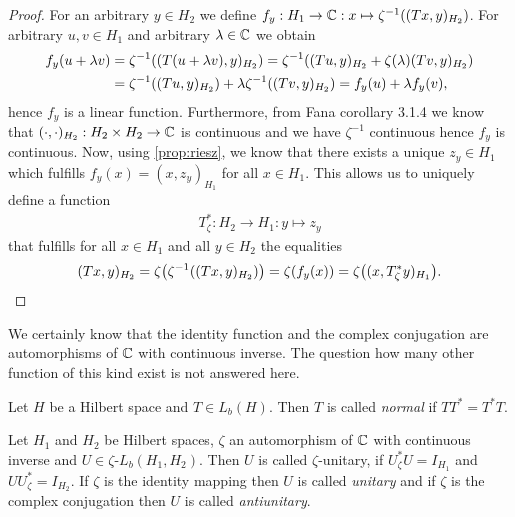 \begin{proof}
	For an arbitrary $y \in H_2$ we define $f_y: H_1 \to \mathbb{C}: x \mapsto \zeta^{-1}{\left ( (Tx,y)_{H_2} \right )}$. For arbitrary $u,v \in H_1$ and arbitrary $\lambda \in \mathbb{C}$ we obtain
	\begin{align*}
		f_y(u + \lambda v) &= \zeta^{-1}{\left ( (T(u + \lambda v), y)_{H_2} \right )} = \zeta^{-1}{\left ( (Tu, y)_{H_2} + \zeta(\lambda) (Tv, y)_{H_2} \right )} \\
		&= \zeta^{-1}{\left ( (Tu,y)_{H_2} \right )} + \lambda \zeta^{-1}{\left ( (Tv,y)_{H_2} \right )} = f_y(u) + \lambda f_y(v),
	\end{align*}
	hence $f_y$ is a linear function. Furthermore, from Fana corollary 3.1.4 we know that $(\cdot, \cdot)_{H_2}: H_2 \times H_2 \to \mathbb{C}$ is continuous and we have $\zeta^{-1}$ continuous hence $f_y$ is continuous. Now, using \ref{prop:riesz}, we know that there exists a unique $z_y \in H_1$ which fulfills $f_y(x) = (x,z_y)_{H_1}$ for all $x \in H_1$. This allows us to uniquely define a function
	\begin{align*}
		T_\zeta^\ast: H_2 \to H_1: y \mapsto z_y
	\end{align*}
	that fulfills for all $x \in H_1$ and all $y \in H_2$ the equalities
	\begin{align*}
		(Tx,y)_{H_2} = \zeta{\left ( \zeta^{-1}{\left ( (Tx,y)_{H_2} \right )} \right )} = \zeta{\left ( f_y(x) \right )} = \zeta {\left ( (x, T_\zeta^\ast y)_{H_1} \right )}.
	\end{align*}
\end{proof}


\begin{remark}
	We certainly know that the identity function and the complex conjugation are automorphisms of $\mathbb{C}$ with continuous inverse. The question how many other function of this kind exist is not answered here.
\end{remark}


\begin{definition}
	Let $H$ be a Hilbert space and $T\in L_b(H)$. Then $T$ is called \textit{normal} if $TT^\ast = T^\ast T$. 
\end{definition}


\begin{definition}
	Let $H_1$ and $H_2$ be Hilbert spaces, $\zeta$ an automorphism of $\mathbb{C}$ with continuous inverse and $U \in \zeta$-$L_b(H_1, H_2)$. Then $U$ is called $\zeta$-unitary, if $U_\zeta^\ast U = I_{H_1}$ and $U U_\zeta^\ast = I_{H_2}$. If $\zeta$ is the identity mapping then $U$ is called \textit{unitary} and if $\zeta$ is the complex conjugation then $U$ is called \textit{antiunitary}.
\end{definition}


